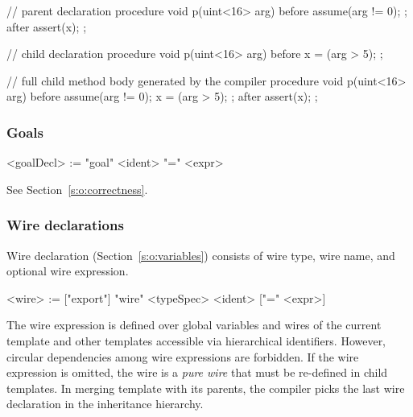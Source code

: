 \begin{tsllisting2}
// parent declaration
procedure void p(uint<16> arg)
before{ 
    assume(arg != 0);
};
after{
    assert(x);
};

// child declaration
procedure void p(uint<16> arg)
before{
    x = (arg > 5);
};

// full child method body generated by the compiler
procedure void p(uint<16> arg)
before{
    assume(arg != 0);
    x = (arg > 5);
};
after{
    assert(x);
};
\end{tsllisting2}


\subsubsection{Goals}

\begin{bnflisting}
<goalDecl> := "goal" <ident> "=" <expr>
\end{bnflisting}

See Section~\ref{s:o:correctness}.

\subsubsection{Wire declarations}

Wire declaration (Section~\ref{s:o:variables}) consists of wire 
type, wire name, and optional wire expression.  

\begin{bnflisting}
<wire> := ["export"] "wire" <typeSpec> <ident> ["=" <expr>]
\end{bnflisting}

The wire expression is defined over global variables and wires of 
the current template and other templates accessible via 
hierarchical identifiers.  However, circular dependencies among 
wire expressions are forbidden.  If the wire expression is 
omitted, the wire is a \emph{pure wire} that must be re-defined in 
child templates.  In merging template with its parents, the \tsl 
compiler picks the last wire declaration in the inheritance 
hierarchy.
